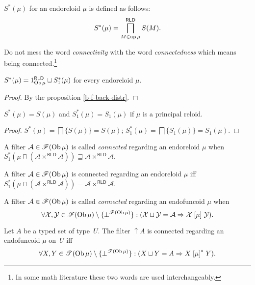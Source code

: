 \begin{defn}
$S^{\ast}(\mu)$
for an endoreloid $\mu$ is defined as follows:
\[
S^{\ast}(\mu)=\bigsqcap_{M\in\operatorname{up}\mu}^{\mathsf{RLD}}S(M).
\]

\end{defn}
Do not mess the word \emph{connectivity} with the word \emph{connectedness}
which means being connected.\footnote{In some math literature these two words are used interchangeably.}
\begin{prop}
$S^{\ast}(\mu)=1_{\operatorname{Ob}\mu}^{\mathsf{RLD}}\sqcup S_{1}^{\ast}(\mu)$
for every endoreloid $\mu$.\end{prop}
\begin{proof}
By the proposition \ref{b-f-back-distr}.\end{proof}
\begin{prop}
$S^{\ast}(\mu)=S(\mu)$ and $S^{\ast}_1(\mu)=S_1(\mu)$ if $\mu$ is a principal reloid.\end{prop}
\begin{proof}
$S^{\ast}(\mu)=\bigsqcap\{S(\mu)\}=S(\mu)$;
$S^{\ast}_1(\mu)=\bigsqcap\{S_1(\mu)\}=S_1(\mu)$.
\end{proof}
\begin{defn}
A filter $\mathcal{A}\in\mathscr{F}(\operatorname{Ob}\mu)$
is called \emph{connected} regarding an endoreloid $\mu$ when $S^{\ast}_1(\mu\sqcap(\mathcal{A}\times^{\mathsf{RLD}}\mathcal{A}))\sqsupseteq\mathcal{A}\times^{\mathsf{RLD}}\mathcal{A}$.\end{defn}
\begin{obvious}
A filter $\mathcal{A}\in\mathscr{F}(\operatorname{Ob}\mu)$ is connected regarding
an endoreloid $\mu$ iff $S^{\ast}_1(\mu\sqcap(\mathcal{A}\times^{\mathsf{RLD}}\mathcal{A}))=\mathcal{A}\times^{\mathsf{RLD}}\mathcal{A}$.\end{obvious}
\begin{defn}
A filter $\mathcal{A}\in\mathscr{F}(\operatorname{Ob}\mu)$
is called \emph{connected} regarding an endofuncoid $\mu$ when
\[
\forall\mathcal{X},\mathcal{Y}\in\mathscr{F}(\operatorname{Ob}\mu)\setminus\{\bot^{\mathscr{F}(\operatorname{Ob}\mu)}\}:(\mathcal{X}\sqcup\mathcal{Y}=\mathcal{A}\Rightarrow\mathcal{X}\mathrel{\left[\mu\right]}\mathcal{Y}).
\]
\end{defn}
\begin{prop}
Let $A$ be a typed set of type~$U$. The filter $\uparrow A$ is
connected regarding an endofuncoid $\mu$ on~$U$ iff
\[
\forall X,Y\in\mathscr{T}(\operatorname{Ob}\mu)\setminus\{\bot^{\mathscr{T}(\operatorname{Ob}\mu)}\}:(X\sqcup Y=A\Rightarrow X\mathrel{\left[\mu\right]^{\ast}}Y).
\]
\end{prop}
